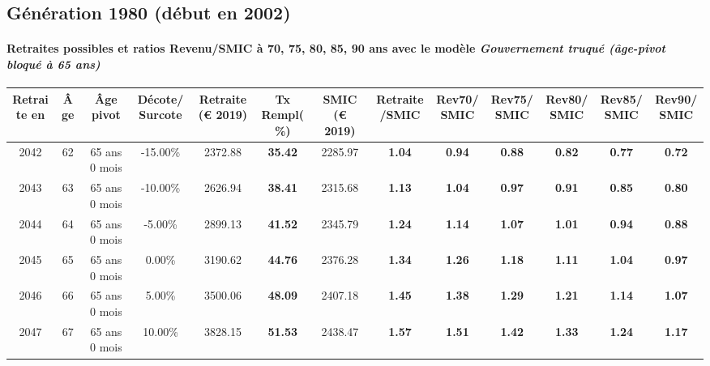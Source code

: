 \newpage 
 
\subsection{Génération 1980 (début en 2002)} 

\paragraph{Retraites possibles et ratios Revenu/SMIC à 70, 75, 80, 85, 90 ans avec le modèle \emph{Gouvernement truqué (âge-pivot bloqué à 65 ans)}}  
 
{ \scriptsize \begin{center} 
\begin{tabular}[htb]{|c|c||c|c||c|c||c||c|c|c|c|c|c|} 
\hline 
 Retraite en &  Âge &  Âge pivot &  Décote/Surcote &  Retraite (\euro{} 2019) &  Tx Rempl(\%) &  SMIC (\euro{} 2019) &  Retraite/SMIC &  Rev70/SMIC &  Rev75/SMIC &  Rev80/SMIC &  Rev85/SMIC &  Rev90/SMIC \\ 
\hline \hline 
 2042 &  62 &  65 ans 0 mois &  -15.00\% &  2372.88 &  {\bf 35.42} &  2285.97 &  {\bf 1.04} &  {\bf {\color{red} 0.94}} &  {\bf {\color{red} 0.88}} &  {\bf {\color{red} 0.82}} &  {\bf {\color{red} 0.77}} &  {\bf {\color{red} 0.72}} \\ 
\hline 
 2043 &  63 &  65 ans 0 mois &  -10.00\% &  2626.94 &  {\bf 38.41} &  2315.68 &  {\bf 1.13} &  {\bf 1.04} &  {\bf {\color{red} 0.97}} &  {\bf {\color{red} 0.91}} &  {\bf {\color{red} 0.85}} &  {\bf {\color{red} 0.80}} \\ 
\hline 
 2044 &  64 &  65 ans 0 mois &  -5.00\% &  2899.13 &  {\bf 41.52} &  2345.79 &  {\bf 1.24} &  {\bf 1.14} &  {\bf 1.07} &  {\bf 1.01} &  {\bf {\color{red} 0.94}} &  {\bf {\color{red} 0.88}} \\ 
\hline 
 2045 &  65 &  65 ans 0 mois &  0.00\% &  3190.62 &  {\bf 44.76} &  2376.28 &  {\bf 1.34} &  {\bf 1.26} &  {\bf 1.18} &  {\bf 1.11} &  {\bf 1.04} &  {\bf {\color{red} 0.97}} \\ 
\hline 
 2046 &  66 &  65 ans 0 mois &  5.00\% &  3500.06 &  {\bf 48.09} &  2407.18 &  {\bf 1.45} &  {\bf 1.38} &  {\bf 1.29} &  {\bf 1.21} &  {\bf 1.14} &  {\bf 1.07} \\ 
\hline 
 2047 &  67 &  65 ans 0 mois &  10.00\% &  3828.15 &  {\bf 51.53} &  2438.47 &  {\bf 1.57} &  {\bf 1.51} &  {\bf 1.42} &  {\bf 1.33} &  {\bf 1.24} &  {\bf 1.17} \\ 
\hline 
\hline 
\end{tabular} 
\end{center} } 
